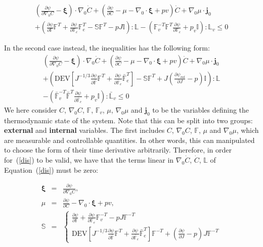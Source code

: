 \documentclass[12pt]{extarticle}
\newcommand{\F}{\ensuremath{\mathbb{F}}}
\newcommand{\LL}{\ensuremath{\mathbb{L}}}
\begin{document}
\begin{equation}
\begin{aligned}
\left(\frac{\partial \psi}{\partial \nabla_0 C}-\boldsymbol{\xi}\right)\cdot \nabla_0 \dot{C} + \left(\frac{\partial \psi}{\partial C}-\mu-\nabla_0\cdot\boldsymbol{\xi}+ p v\right) \dot{C}+ \nabla_0 \mu \cdot \mathbf{j}_0 \\
+\left(\frac{\partial \psi}{\partial \F}\F^T + \frac{\partial \psi}{\partial \F_e}\F_e^{T}- \mathbb{S}\F^T - p J \mathbb{I}\right):\LL- \left(\F_v^{-T}\F^T \frac{\partial \psi}{\partial \F_e}+p_v  \mathbb{I}\right):\LL_v \leq 0
\end{aligned}
\label{dis}
\end{equation}

In the second case instead, the inequalities has the following form:
\begin{equation}
\begin{aligned}
\left(\frac{\partial \psi}{\partial \nabla_0 C}-\boldsymbol{\xi}\right)\cdot \nabla_0 \dot{C} + \left(\frac{\partial \psi}{\partial C}-\mu-\nabla_0\cdot\boldsymbol{\xi}+ p v\right) \dot{C}+ \nabla_0 \mu \cdot \mathbf{j}_0 \\
+\left(\text{DEV}\left[J^{-1/3}\frac{\partial \psi}{\partial \bar{\F}}\F^T + \frac{\partial \psi}{\partial \bar{\F}_e}\bar{\F}_e^{T}\right]- \mathbb{S}\F^T +J\left(\frac{\partial \psi_{vol}}{\partial J} - p\right)\mathbb{I}\right):\LL\\
- \left(\bar{\F}_v^{-T}\bar{\F}^T \frac{\partial \psi}{\partial \bar{\F}_e}+p_v  \mathbb{I}\right):\bar{\LL}_v \leq 0
\end{aligned}
\end{equation}
We here consider $C$, $\nabla_0 C$, $\F$, $\F_v$, $\mu$, $\nabla_0 \mu$ and $\mathbf{j}_0$ to be the variables defining the thermodynamic state of the system. Note that this can be split into two groups: \textbf{external} and \textbf{internal} variables. The first includes $C$, $\nabla_0 C$, $\F$,  $\mu$ and $\nabla_0 \mu$, which are measurable and controllable quantities. In other words, this can manipulated to choose the form of their time derivative arbitrarily. Therefore, in order for~(\ref{dis}) to be valid, we have that the terms linear in $\nabla_0 \dot{C}$, $\dot{C}$, $\LL$ of Equation~(\ref{dis}) must be zero:

\begin{eqnarray}
	\mathbf{\xi}&=&\frac{\partial \psi}{\partial \nabla_0 C},\\[2mm]
	\mu &=& \frac{\partial \psi}{\partial C} - \nabla_0\cdot\boldsymbol{\xi}+ p v,\\[2mm]
	\mathbb{S} &=& \begin{cases} \frac{\partial \psi}{\partial \F} + \frac{\partial \psi}{\partial \F_e}\F_v^{-T}- p J \F^{-T}\\[3mm]
	\text{DEV}\left[J^{-1/3}\frac{\partial \psi}{\partial \bar{\F}}\F^T+\frac{\partial \psi}{\partial \bar{\F}_e}\bar{\F}_e^T\right]\F^{-T} + \left(\frac{\partial \psi}{\partial J}- p \right)J \F^{-T}
	\end{cases}
\end{eqnarray}
\end{document}
